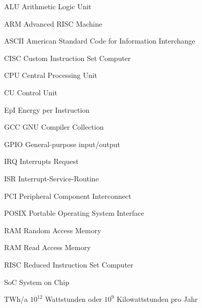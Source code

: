 \begin{abkuerzungen}[MUSTER] %
\item[ALU] Arithmetic Logic Unit
\item[ARM] Advanced RISC Machine
\item[ASCII] American Standard Code for Information Interchange
\item[CISC] Custom Instruction Set Computer
\item[CPU] Central Processing Unit
\item[CU] Control Unit
\item[EpI] Energy per Instruction
\item[GCC] GNU Compiler Collection
\item[GPIO] General-purpose input/output
\item[IRQ] Interrupts Request
\item[ISR] Interrupt-Service-Routine
\item[PCI] Peripheral Component Interconnect
\item[POSIX] Portable Operating System Interface
\item[RAM] Random Access Memory
\item[RAM] Read Access Memory
\item[RISC] Reduced Instruction Set Computer
\item[SoC] System on Chip
\item[TWh/a] $10^{12}$ Wattstunden oder $10^{9}$ Kilowattstunden pro Jahr


\end{abkuerzungen}
